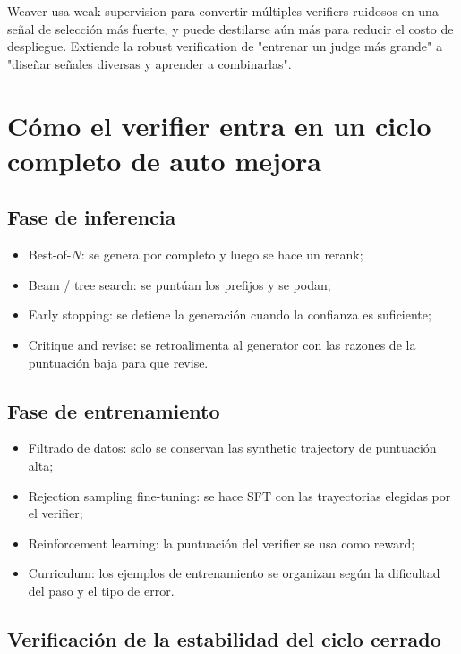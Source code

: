 \documentclass[a4paper]{article}
\begin{document}
Weaver usa weak supervision para convertir múltiples verifiers ruidosos en una señal de selección más fuerte, y puede destilarse aún más para reducir el costo de despliegue. Extiende la robust verification de "entrenar un judge más grande" a "diseñar señales diversas y aprender a combinarlas".
\section{Cómo el verifier entra en un ciclo completo de auto mejora}

\subsection{Fase de inferencia}

\begin{itemize}
    \item Best-of-$N$: se genera por completo y luego se hace un rerank;
    \item Beam / tree search: se puntúan los prefijos y se podan;
    \item Early stopping: se detiene la generación cuando la confianza es suficiente;
    \item Critique and revise: se retroalimenta al generator con las razones de la puntuación baja para que revise.
\end{itemize}

\subsection{Fase de entrenamiento}

\begin{itemize}
    \item Filtrado de datos: solo se conservan las synthetic trajectory de puntuación alta;
    \item Rejection sampling fine-tuning: se hace SFT con las trayectorias elegidas por el verifier;
    \item Reinforcement learning: la puntuación del verifier se usa como reward;
    \item Curriculum: los ejemplos de entrenamiento se organizan según la dificultad del paso y el tipo de error.
\end{itemize}

\subsection{Verificación de la estabilidad del ciclo cerrado}
\end{document}
